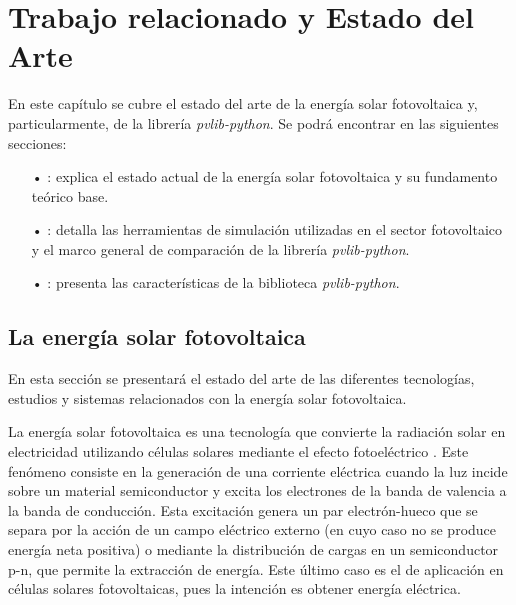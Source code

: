 \chapter{Trabajo relacionado y Estado del Arte} \label{chp:state-of-the-art}

En este capítulo se cubre el estado del arte de la energía solar fotovoltaica y, particularmente, de la librería \textit{pvlib-python}. Se podrá encontrar en las siguientes secciones:

\begin{itemize}

      \item[•] : explica el estado actual de la energía solar fotovoltaica y su fundamento teórico base.

      \item[•] : detalla las herramientas de simulación utilizadas en el sector fotovoltaico y el marco general de comparación de la librería \textit{pvlib-python}.

      \item[•] : presenta las características de la biblioteca \textit{pvlib-python}.

\end{itemize}


\section{La energía solar fotovoltaica} \label{sct:energia-solar}

En esta sección se presentará el estado del arte de las diferentes tecnologías, estudios y sistemas relacionados con la energía solar fotovoltaica.

La energía solar fotovoltaica es una tecnología que convierte la radiación solar en electricidad utilizando células solares mediante el efecto fotoeléctrico \cite[][pp. 701-706]{böer2002survey}.
Este fenómeno consiste en la generación de una corriente eléctrica cuando la luz incide sobre un material semiconductor y excita los electrones de la banda de valencia a la banda de conducción. Esta excitación genera un par electrón-hueco que se separa por la acción de un campo eléctrico externo (en cuyo caso no se produce energía neta positiva) o mediante la distribución de cargas en un semiconductor p-n, que permite la extracción de energía. Este último caso es el de aplicación en células solares fotovoltaicas, pues la intención es obtener energía eléctrica.

